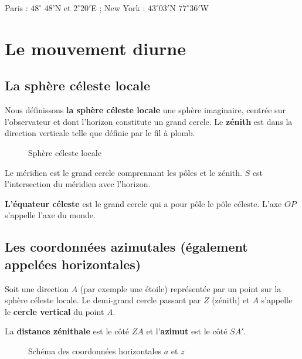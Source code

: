 \documentclass[12pt]{report}
\begin{document}
Paris : $48^\circ$ 48'N  et $2^\circ20'$E  ; New York : $43^\circ03'$N $77^\circ36'$W


\bigskip

\par\noindent
\chapter{Le mouvement diurne}

\section{La sphère céleste locale} 

Nous définissons \textbf{la sphère céleste locale} une sphère imaginaire, centrée sur l'observateur et dont l'horizon constitute un grand cercle. Le \textbf{zénith} est dans la direction verticale telle que définie par le fil à plomb.


\begin{figure}[ht]
\begin{center}
\end{center}
\caption{Sphère céleste locale}
\label{fig:14}
\end{figure}

Le méridien est le grand cercle comprennant les pôles et le zénith. $S$ est l'intersection du méridien avec l'horizon.

\textbf{L'équateur céleste} est le grand cercle qui a pour pôle le pôle céleste. L'axe $OP$ s'appelle l'axe du monde.


\section{Les coordonnées azimutales (également appelées horizontales)}

Soit une direction $A$ (par exemple une étoile) représentée par un point sur la sphère céleste locale. Le demi-grand cercle passant par $Z$ (zénith) et $A$ s'appelle le \textbf{cercle vertical} du point $A$. 

La \textbf{distance zénithale} est le côté $ZA$ et l'\textbf{azimut} est le côté $SA'$.


\begin{figure}[ht]
\begin{center}
\end{center}
\caption{Schéma des coordonnées horizontales $a$ et $z$}
\label{fig:15}
\end{figure}
\end{document}
